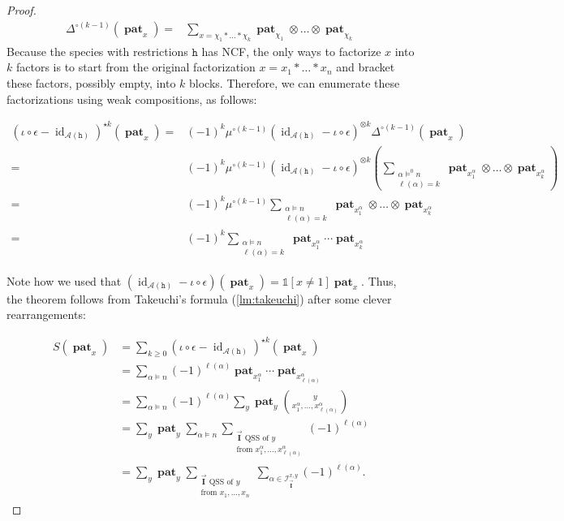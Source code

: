 \documentclass[12pt, reqno]{amsart}
\theoremstyle{definition}
\newcommand{\III}{\vec{\mathbf{I}}}
\DeclareMathOperator{\id}{id}
\DeclareMathOperator{\pat}{\mathbf{pat}}
\begin{document}
\begin{proof}
\begin{align*}
\Delta^{\circ (k-1)} (\pat_x)
    =& \sum_{x = \chi_1 \ast \dots \ast \chi_k} \pat_{\chi_1}\otimes \dots \otimes \pat_{\chi_k}
\end{align*}
Because the species with restrictions $\mathtt{h}$ has NCF, the only ways to factorize $x$ into $k$ factors is to start from the original factorization $x = x_1 \ast \dots \ast x_n$ and bracket these factors, possibly empty, into $k$ blocks.
Therefore, we can enumerate these factorizations using weak compositions, as follows:

\begin{align*}
(\iota \circ \epsilon -  \id_{\mathcal A (\mathtt{h})})^{\star k} (\pat_x)
    =& (-1)^k  \mu^{\circ(k-1)}( \id_{\mathcal A (\mathtt{h})} - \iota \circ \epsilon)^{\otimes k} \Delta^{\circ(k-1)} (\pat_x)\\
    =& (-1)^k  \mu^{\circ(k-1)}( \id_{\mathcal A (\mathtt{h})} - \iota \circ \epsilon)^{\otimes k}\left(\sum_{\substack{\alpha\models^0 n \\ \ell(\alpha) = k}} \pat_{x^{\alpha}_1} \otimes \dots \otimes \pat_{x^{\alpha}_k} \right) \\
    =&  (-1)^k  \mu^{\circ(k-1)} \sum_{\substack{\alpha\models n \\ \ell(\alpha) = k}}  \pat_{x^{\alpha}_1} \otimes \dots \otimes \pat_{x^{\alpha}_k}\\
    =&  (-1)^k \sum_{\substack{\alpha\models n \\ \ell(\alpha) = k}}  \pat_{x^{\alpha}_1}  \cdots \pat_{x^{\alpha}_k}
\end{align*}

Note how we used that $(\id_{\mathcal A (\mathtt{h})} - \iota \circ \epsilon ) (\pat_x) = \mathbb{1}[x \neq 1]\pat_x$.
Thus, the theorem follows from Takeuchi's formula (\cref{lm:takeuchi}) after some clever rearrangements:

\begin{align*}
S(\pat_x)&= \sum_{k\geq 0 } (\iota \circ \epsilon -  \id_{\mathcal A (\mathtt{h})})^{\star k} (\pat_x) \\
         &= \sum_{\alpha \models n} (-1)^{\ell(\alpha)} \pat_{x^{\alpha}_1} \cdots \pat_{x^{\alpha}_{\ell(\alpha)}}\\
         &= \sum_{\alpha \models n } (-1)^{\ell(\alpha)} \sum_y \pat_y \binom{y}{x^{\alpha}_1,  \dots , x^{\alpha}_{\ell(\alpha)}}\\
         &= \sum_y \pat_y \sum_{\alpha \models n} \sum_{  \substack{\III \text{ QSS of $y$}\\ \text{from }x^{\alpha}_1,  \dots , x^{\alpha}_{\ell(\alpha)} }} (-1)^{\ell(\alpha)}\\
         &= \sum_y \pat_y \sum_{  \substack{\III \text{ QSS of $y$}\\ \text{from }x_1 , \dots ,  x_n }} \sum_{\alpha \in \mathcal I^{x, y}_{\III}} (-1)^{\ell(\alpha)}.
\end{align*}


\end{proof}
\end{document}
